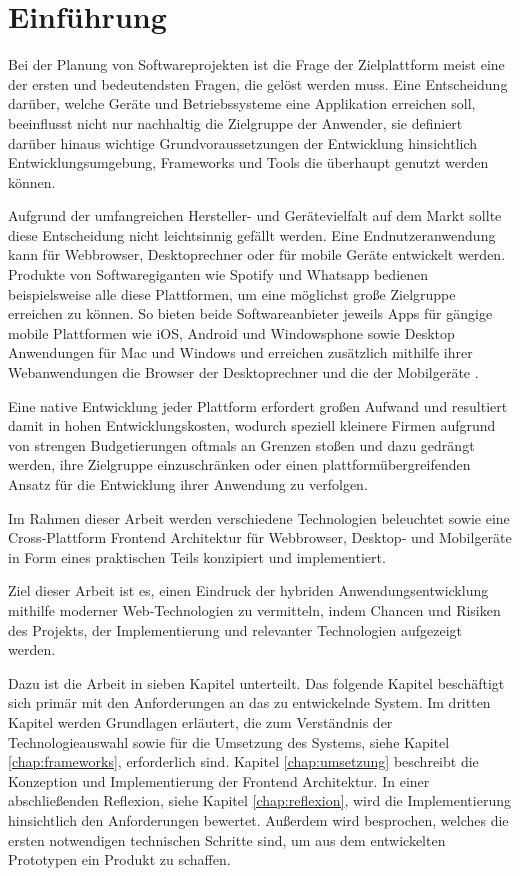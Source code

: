
\chapter{Einführung}
\label{chap:introduction}

Bei der Planung von Softwareprojekten ist die Frage der Zielplattform meist eine der ersten und bedeutendsten Fragen,
die gelöst werden muss. Eine Entscheidung darüber, welche Geräte und Betriebssysteme eine Applikation erreichen soll,
beeinflusst nicht nur nachhaltig die Zielgruppe der Anwender, sie definiert darüber hinaus wichtige Grundvoraussetzungen der Entwicklung hinsichtlich Entwicklungsumgebung, Frameworks und Tools die überhaupt genutzt werden können.

Aufgrund der umfangreichen Hersteller- und Gerätevielfalt auf dem Markt sollte diese Entscheidung nicht leichtsinnig gefällt werden.
Eine Endnutzeranwendung kann für Webbrowser, Desktoprechner oder für mobile Geräte entwickelt werden.
Produkte von Softwaregiganten wie Spotify und Whatsapp bedienen beispielsweise alle diese Plattformen, um eine möglichst große Zielgruppe erreichen zu können.
So bieten beide Softwareanbieter jeweils Apps für gängige mobile Plattformen wie iOS, Android und Windowsphone
sowie Desktop Anwendungen für Mac und Windows und erreichen zusätzlich mithilfe ihrer Webanwendungen die Browser der Desktoprechner
und die der Mobilgeräte \cite{Spoti93:online} \cite{Whats74:online} \cite{Whats6:online}.

Eine native Entwicklung jeder Plattform erfordert großen Aufwand und resultiert damit in hohen
Entwicklungskosten, wodurch speziell kleinere Firmen aufgrund von strengen Budgetierungen oftmals
an Grenzen stoßen und
dazu gedrängt werden, ihre Zielgruppe einzuschränken oder einen plattformübergreifenden Ansatz für
die Entwicklung ihrer Anwendung zu verfolgen.

Im Rahmen dieser Arbeit werden verschiedene Technologien beleuchtet sowie eine
Cross-Plattform Frontend Architektur für Webbrowser, Desktop- und Mobilgeräte in Form eines praktischen Teils
konzipiert und implementiert.

Ziel dieser Arbeit ist es, einen Eindruck der hybriden Anwendungsentwicklung mithilfe moderner
Web-Technologien zu vermitteln, indem Chancen und Risiken des Projekts, der Implementierung und relevanter Technologien aufgezeigt werden.

\vspace{0.6cm}

\noindent
Dazu ist die Arbeit in sieben Kapitel unterteilt. Das folgende Kapitel beschäftigt sich primär mit den
Anforderungen an das zu entwickelnde System.
Im dritten Kapitel werden Grundlagen erläutert, die zum Verständnis der Technologieauswahl
sowie für die Umsetzung des Systems, siehe Kapitel \ref{chap:frameworks}, erforderlich sind.
Kapitel \ref{chap:umsetzung} beschreibt die Konzeption und Implementierung der Frontend Architektur.
In einer abschließenden Reflexion, siehe Kapitel \ref{chap:reflexion}, wird die Implementierung hinsichtlich den Anforderungen bewertet.
Außerdem wird besprochen, welches die ersten notwendigen technischen Schritte sind, um aus dem entwickelten Prototypen ein Produkt zu schaffen.
